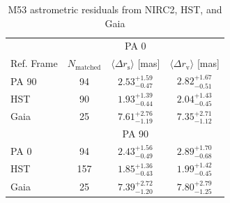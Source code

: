 \documentclass[]{spie}  %
\begin{document}

\begin{table}[!h]
\caption{M53 astrometric residuals from NIRC2, HST, and Gaia}
\setlength{\tabcolsep}{11.0pt}
\begin{center}
\begin{tabular}{lccc}
    \hline\hline
    {} & {} & \multicolumn{1}{c}{PA 0}\\
    \cmidrule(lr){2-4}
        Ref. Frame & $N_{\textrm{matched}}$ & $\langle \Delta r_{\textrm{s}}\rangle$ [mas] & $\langle \Delta r_{\textrm{v}}\rangle$ [mas]\\
        \hline
        PA 90 & 94 & $2.53 ^ {+1.59}_{-0.47}$ & $2.82 ^ {+1.67}_{-0.51}$\\
        HST & 90 &  $1.93 ^ {+1.39}_{-0.44}$ & $2.04 ^ {+1.43}_{-0.45}$\\
        Gaia & 25 &  $7.61 ^ {+2.76}_{-1.19}$ & $7.35 ^ {+2.71}_{-1.12}$\\
        \hline
        {} & {} & PA 90 & {}\\
        \cmidrule(lr){2-4}
        PA 0 & 94 & $2.43 ^ {+1.56}_{-0.49}$ & $2.89 ^ {+1.70}_{-0.68}$\\
        HST & 157 &  $1.85 ^ {+1.36}_{-0.43}$ & $1.99 ^ {+1.42}_{-0.45}$\\
        Gaia & 25 &  $7.39 ^ {+2.72}_{-1.20}$ & $7.80 ^ {+2.79}_{-1.25}$\\
        \hline
\end{tabular}
\end{center}
\label{tab:m53-AstromResidual-results}
\end{table}
\end{document}
